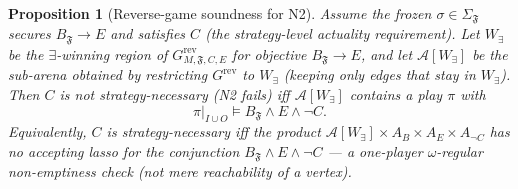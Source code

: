 \documentclass[11pt]{article}
\newtheorem{proposition}{Proposition}
\theoremstyle{remark}
\newcommand{\Frame}{\mathfrak{F}}
\begin{document}
\begin{proposition}[Reverse-game soundness for N2]
\label{prop:rpg-sound}
Assume the frozen \(\sigma\in\Sigma_{\Frame}\) secures \(B_{\Frame}\rightarrow E\)
and satisfies \(C\) (the strategy-level actuality requirement). Let \(W_\exists\)
be the \(\exists\)-winning region of \(G^{\mathrm{rev}}_{M,\Frame,C,E}\) for
objective \(B_{\Frame}\rightarrow E\), and let \(\mathcal{A}[W_\exists]\) be the
sub-arena obtained by restricting \(G^{\mathrm{rev}}\) to \(W_\exists\) (keeping
only edges that stay in \(W_\exists\)). Then \(C\) is \emph{not}
strategy-necessary (N2 fails) iff \(\mathcal{A}[W_\exists]\) contains a play
\(\pi\) with
\[
  \pi|_{I\cup O}\models B_{\Frame}\wedge E\wedge\neg C .
\]
Equivalently, \(C\) is strategy-necessary iff the product
\(\mathcal{A}[W_\exists]\times A_B\times A_E\times A_{\neg C}\) has no accepting
lasso for the conjunction \(B_{\Frame}\wedge E\wedge\neg C\) --- a one-player
\(\omega\)-regular non-emptiness check (not mere reachability of a vertex).
\end{proposition}
\end{document}
